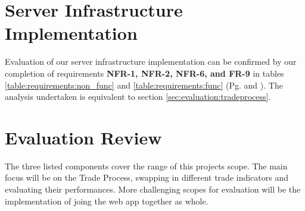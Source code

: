 \section{Server Infrastructure Implementation}
\label{sec:evaluation:simulteneous}
\noindent Evaluation of our server infrastructure implementation can be confirmed by our completion of requirements \textbf{NFR-1, NFR-2, NFR-6, and FR-9} in tables \ref{table:requirements:non_func} and \ref{table:requirements:func} (Pg. \pageref{table:requirements:non_func} and \pageref{table:requirements:func}). The analysis undertaken is equivalent to section \ref{sec:evaluation:tradeprocess}.


\section{Evaluation Review}
\label{sec:evaluation:review}

\noindent The three listed components cover the range of this projects scope. The main focus will be on the Trade Process, swapping in different trade indicators and evaluating their performances. More challenging scopes for evaluation will be the implementation of joing the web app together as whole.